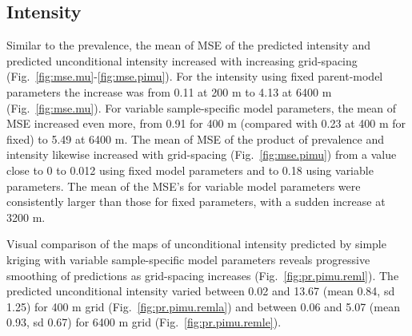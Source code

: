 \documentclass[review]{elsarticle}
\begin{document}
\subsection{Intensity}
Similar to the prevalence, the  mean of MSE of the predicted intensity and predicted unconditional intensity increased with increasing grid-spacing (Fig.~\ref{fig:mse.mu}-\ref{fig:mse.pimu}). For the intensity using fixed parent-model parameters the increase was from 0.11 at 200 m to 4.13 at 6400 m (Fig.~\ref{fig:mse.mu}). For variable sample-specific model parameters, the mean of MSE increased even more, from 0.91 for 400 m (compared with 0.23 at 400 m for fixed) to 5.49 at 6400 m.  The  mean of MSE of the product of prevalence and intensity likewise increased with grid-spacing (Fig.~\ref{fig:mse.pimu}) from a value close to 0 to 0.012 using fixed model parameters and to 0.18 using variable parameters. The mean of the MSE's for variable model parameters were consistently larger than those for fixed parameters, with 
a sudden increase at 3200 m.

Visual comparison of the maps of unconditional intensity predicted by simple kriging with variable sample-specific model parameters reveals progressive smoothing of predictions as grid-spacing increases (Fig.~\ref{fig:pr.pimu.reml}). The predicted unconditional intensity varied between 0.02 and 13.67 (mean 0.84, sd 1.25) for 400 m grid (Fig.~\ref{fig:pr.pimu.remla}) and between 0.06 and 5.07 (mean 0.93, sd 0.67) for 6400 m grid (Fig.~\ref{fig:pr.pimu.remle}).
\end{document}
